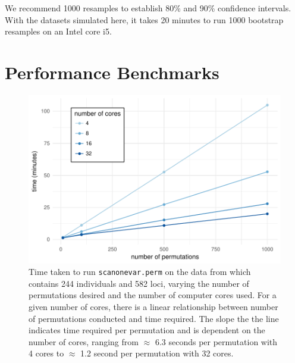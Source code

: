 \documentclass[9pt,twocolumn,twoside]{gsag3jnl}
\begin{document}
We recommend 1000 resamples to establish 80\% and 90\% confidence intervals.
With the datasets simulated here, it takes 20 minutes to run 1000 bootstrap resamples on an Intel core i5.


\section*{Performance Benchmarks}


\begin{figure}[t]
    \includegraphics[width = \linewidth]{images/benchmark_kumar.pdf}
    \caption{
        Time taken to run \texttt{scanonevar.perm} on the data from \citet{Kumar2013} which contains 244 individuals and 582 loci, varying the number of permutations desired and the number of computer cores used.
        For a given number of cores, there is a linear relationship between number of permutations conducted and time required.
        The slope the the line indicates time required per permutation and is dependent on the number of cores, ranging from $\approx$ 6.3 seconds per permutation with 4 cores to $\approx$ 1.2 second per permutation with 32 cores.
    }
    \label{fig:benchmark_kumar}
\end{figure}
\end{document}
